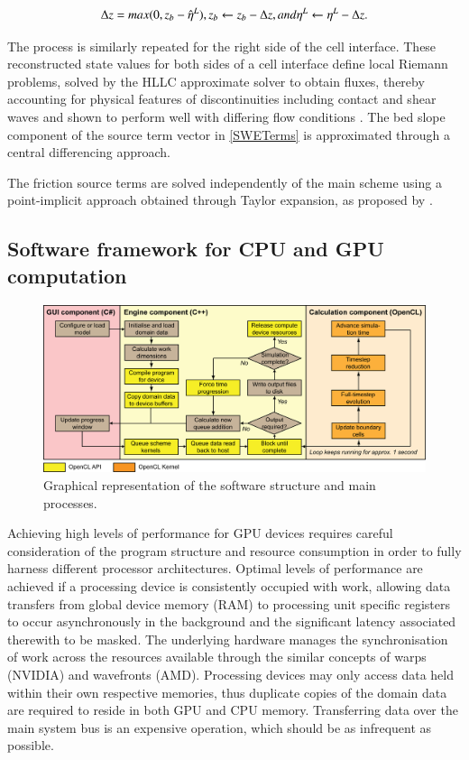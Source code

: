 \documentclass[11pt,english,a4paper]{article}
\begin{document}
\begin{equation}
	\label{Reconstruction3}
		\Delta{z} = max( 0, z_{b} - \hat{\eta}^{L} ), \hfill
		z_b \gets z_b - \Delta{z}, \hfill and \hfill
		\eta^L \gets \eta^L - \Delta{z} . \hfill
\end{equation}

The process is similarly repeated for the right side of the cell interface. These reconstructed state values for both sides of a cell interface define local Riemann problems, solved by the HLLC approximate solver to obtain fluxes, thereby accounting for physical features of discontinuities including contact and shear waves \citep{Toro1994} and shown to perform well with differing flow conditions \citep{Erduran2002a}. The bed slope component of the source term vector in \eqref{SWETerms} is approximated through a central differencing approach. 

The friction source terms are solved independently of the main scheme using a point-implicit approach obtained through Taylor expansion, as proposed by \citet{Liang2010b}. 

\subsection{Software framework for CPU and GPU computation}

\begin{figure}[tpb]
\centering
\includegraphics[width=1.0\textwidth]{Figure1.png}
\caption{Graphical representation of the software structure and main processes.}
\label{SoftwareProcesses}
\end{figure}

Achieving high levels of performance for GPU devices requires careful consideration of the program structure and resource consumption in order to fully harness different processor architectures. Optimal levels of performance are achieved if a processing device is consistently occupied with work, allowing data transfers from global device memory (RAM) to processing unit specific registers to occur asynchronously in the background and the significant latency associated therewith to be masked. The underlying hardware manages the synchronisation of work across the resources available through the similar concepts of warps (NVIDIA) and wavefronts (AMD). Processing devices may only access data held within their own respective memories, thus duplicate copies of the domain data are required to reside in both GPU and CPU memory. Transferring data over the main system bus is an expensive operation, which should be as infrequent as possible.
\end{document}
